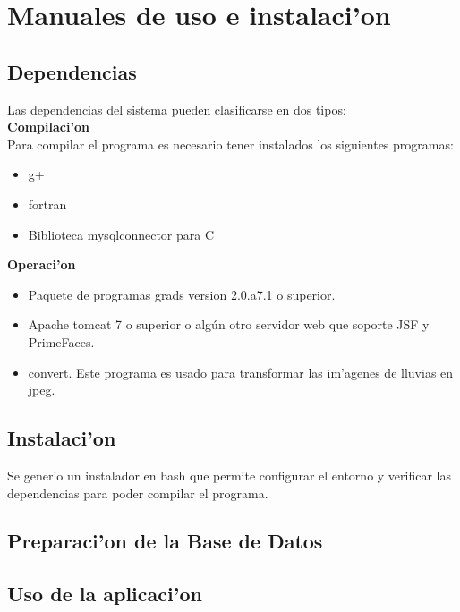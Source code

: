 \chapter{Manuales de uso e instalaci'on}

\section{Dependencias}
Las dependencias del sistema pueden clasificarse en dos tipos:\\
\textbf{Compilaci'on} 
\\
Para compilar el programa es necesario tener instalados los siguientes programas:
\begin{itemize}
 \item g+
  \item fortran
  \item Biblioteca mysqlconnector para C  
\end{itemize}

\textbf{Operaci'on} 

\begin{itemize}
 \item Paquete de programas grads version 2.0.a7.1 o superior.
  \item Apache tomcat 7 o superior o algún otro servidor web que soporte JSF y PrimeFaces.
  \item convert. Este programa es usado para transformar las im'agenes de lluvias en jpeg.
\end{itemize}

\section{Instalaci'on}
Se gener'o un instalador en bash que permite configurar el entorno y verificar las dependencias para poder compilar
el programa.

\section{Preparaci'on de la Base de Datos}


\section{Uso de la aplicaci'on}

